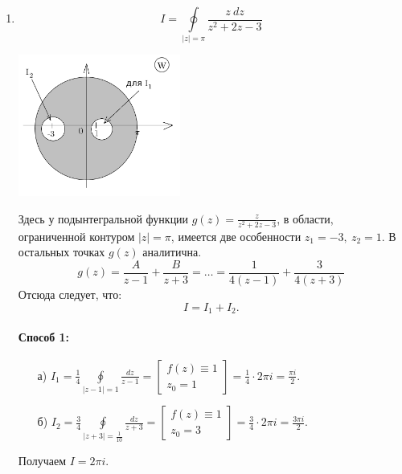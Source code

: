 \documentclass[../../main.tex]{subfiles}
\begin{document}
\begin{examples}
	\begin{enumerate}
		\item 
		\[ I = \oint \limits_{|z| = \pi} \frac{z \ dz}{z^2 + 2z - 3}  \]
		\begin{center}
		\includegraphics[width=0.42\textwidth]{lec32_3}
		\end{center}
		Здесь у подынтегральной функции $g(z) = \frac{z}{z^2 + 2z - 3}$, в области, 
		ограниченной контуром $|z| = \pi$, имеется две особенности $z_1 = -3,\ z_2 = 
		1$. В остальных точках $g(z)$ аналитична.
		\[  g(z) = \frac{A}{z-1} + \frac{B}{z+3} = \dots = \frac{1}{4(z-1)} + 
		\frac{3}{4(z+3)}  \]
		Отсюда следует, что:
		\[ I = I_1 + I_2.  \]
			\paragraph{Способ 1:}
			\begin{itemize}
				\item[а)]
				$\displaystyle I_1 = \frac{1}{4} \oint \limits_{|z-1| = 1} \frac{dz}{z-1} = \left[ 
				\begin{gathered} f(z) \equiv 1 \\
				z_0 = 1 
				\end{gathered} \right] = \frac{1}{4} \cdot 2 \pi i = \frac{\pi i }{2}    .$
				\item[б)]  
				$\displaystyle  I_2 = \frac{3}{4} \oint \limits_{|z+3| = \frac{1}{10}} \frac{dz}{z+3} = 
				\left[ \begin{gathered} f(z) \equiv 1 \\
				z_0 = 3 
				\end{gathered} \right] = \frac{3}{4} \cdot 2 \pi i = \frac{3 \pi i }{2}    
				.$
			\end{itemize}
			Получаем $ I = 2 \pi i $.

\end{enumerate}
\end{examples}
\end{document}
